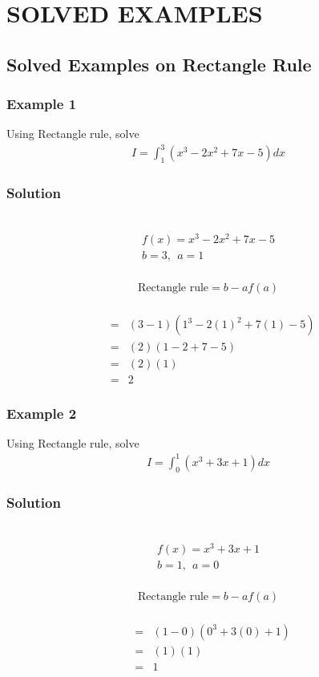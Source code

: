 \documentclass[12pt]{report}
\newcommand{\sps}{\\[0.2cm]}
\begin{document}
	
	\chapter{SOLVED EXAMPLES}
	\section{Solved Examples on Rectangle Rule}
	\subsection{Example 1}
	Using Rectangle rule, solve
	\begin{gather*}
		I = \int_1^3\left(x^3 - 2x^2 + 7x - 5\right)dx
	\end{gather*}
	\subsection*{Solution}
	{~}\\[-2.1cm]
	\begin{eqnarray*}
		f(x) = x^3 - 2x^2 + 7x - 5\sps
		b = 3,~~ a = 1
	\end{eqnarray*}
	{~}\\[-2.1cm]
	\begin{gather*}
		\text{Rectangle rule} = b-af(a)
	\end{gather*}
	{~}\\[-2.1cm]
	\begin{eqnarray*}
		&=&(3-1)(1^3 - 2(1)^2 + 7(1) - 5)\sps
		&=&(2)(1-2+7-5)\sps
		&=&(2)(1)\sps
		&=&2
	\end{eqnarray*}
	
	\subsection{Example 2}
	Using Rectangle rule, solve
	\begin{eqnarray*}
		I = \int_0^1\left(x^3 + 3x + 1\right)dx
	\end{eqnarray*}

	\subsection*{Solution}
	{~}\\[-2.1cm]
	\begin{gather*}
		f(x) = x^3 + 3x + 1\sps
		b=1,~~ a = 0
	\end{gather*}
	{~}\\[-2.1cm]
	\begin{gather*}
		\text{Rectangle rule} = b-af(a)
	\end{gather*}
	{~}\\[-2.1cm]
	\begin{eqnarray*}
		&=&(1-0)(0^3 + 3(0) + 1)\sps
		&=&(1)(1)\sps
		&=&1
	\end{eqnarray*}
	
\end{document}
